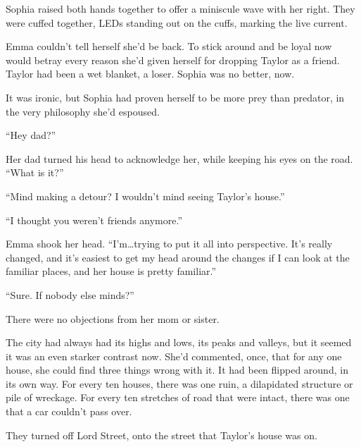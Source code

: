 Sophia raised both hands together to offer a miniscule wave with her right.  They were cuffed together, LEDs standing out on the cuffs, marking the live current.



Emma couldn't tell herself she'd be back.  To stick around and be loyal now would betray every reason she'd given herself for dropping Taylor as a friend.  Taylor had been a wet blanket, a loser.  Sophia was no better, now.



It was ironic, but Sophia had proven herself to be more prey than predator, in the very philosophy she'd espoused.



\blacksquare



``Hey dad?''



Her dad turned his head to acknowledge her, while keeping his eyes on the road. ``What is it?''



``Mind making a detour?  I wouldn't mind seeing Taylor's house.''



``I thought you weren't friends anymore.''



Emma shook her head.  ``I'm\ldots trying to put it all into perspective.  It's really changed, and it's easiest to get my head around the changes if I can look at the familiar places, and her house is pretty familiar.''



``Sure.  If nobody else minds?''



There were no objections from her mom or sister.



The city had always had its highs and lows, its peaks and valleys, but it seemed it was an even starker contrast now.  She'd commented, once, that for any one house, she could find three things wrong with it.  It had been flipped around, in its own way.  For every ten houses, there was one ruin, a dilapidated structure or pile of wreckage.  For every ten stretches of road that were intact, there was one that a car couldn't pass over.



They turned off Lord Street, onto the street that Taylor's house was on.




